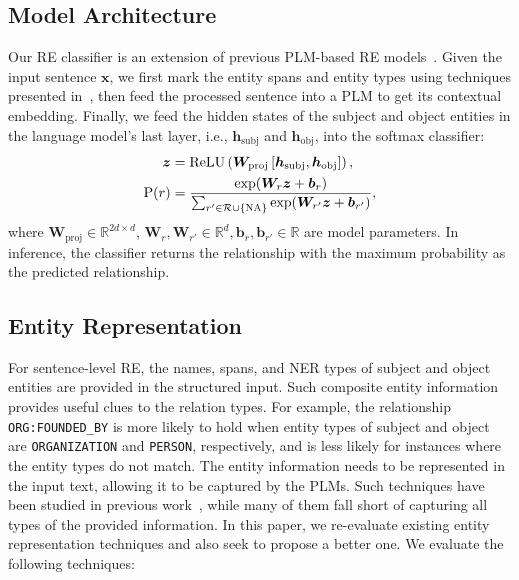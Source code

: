 \documentclass[11pt,a4paper]{article}
\begin{document}
\subsection{Model Architecture}
\label{sec:model_architecture}
Our RE classifier is an extension of previous PLM-based RE models~\cite{baldini-soares-etal-2019-matching}.
Given the input sentence $\bm{x}$, we first mark the entity spans and entity types using techniques presented in~, then feed the processed sentence into a PLM to get its contextual embedding.
Finally, we feed the hidden states of the subject and object entities in the language model's last layer, i.e., $\bm{h}_\text{subj}$ and $\bm{h}_\text{obj}$, into the softmax classifier:
\begin{align*}
    \bm{z} &= \text{ReLU}\left(\bm{W}_\text{proj}\left[\bm{h}_\text{subj}, \bm{h}_\text{obj}\right]\right), \\
    \mathrm{P}(r) &= \frac{\exp(\bm{W}_r \bm{z} + \bm{b}_{r})}{\sum_{r'\in \mathcal{R} \cup \{\textsc{NA}\}} \exp(\bm{W}_{r'} \bm{z}  + \bm{b}_{r'})},
\end{align*}
where $\bm{W}_\text{proj} \in \mathbb{R}^{2d \times d}$, $\bm{W}_{r}, \bm{W}_{{r'}} \in \mathbb{R}^d, \bm{b}_{r}, \bm{b}_{r'} \in \mathbb{R}$ are model parameters.
In inference, the classifier returns the relationship with the maximum probability as the predicted relationship.
\subsection{Entity Representation}
\label{sec:entity_representation}
For sentence-level RE, the names, spans, and NER types of subject and object entities are provided in the structured input.
Such composite entity information provides useful clues to the relation types.
For example, the relationship \texttt{ORG:FOUNDED\_BY} is more likely to hold when entity types of subject and object are \texttt{ORGANIZATION} and \texttt{PERSON}, respectively, and is less likely for instances where the entity types do not match.
The entity information needs to be represented in the input text, allowing it to be captured by the PLMs.
Such techniques have been studied in previous work~\cite{zhang-etal-2017-position,baldini-soares-etal-2019-matching,wang2020k}, while many of them fall short of capturing all types of the provided information.
In this paper, we re-evaluate existing entity representation techniques and also seek to propose a better one.
We evaluate the following techniques:
\end{document}
